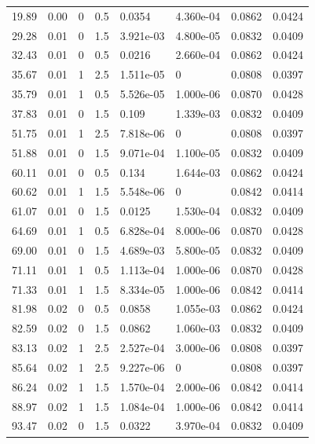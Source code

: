\documentclass[preview]{standalone}
\begin{document}
{{\begin{tabular}{L{1.2cm}C{1.2cm} C{0.3cm}C{0.5cm} C{1.4cm}C{1.4cm} C{1.4cm}C{1.4cm}}
  19.89  &  0.00  & 0     & 0.5 &  0.0354  & 4.360e-04  & 0.0862 &  0.0424   \\ 
  29.28  &  0.01  & 0     & 1.5 &  3.921e-03  & 4.800e-05  & 0.0832 &  0.0409   \\ 
  32.43  &  0.01  & 0     & 0.5 &  0.0216  & 2.660e-04  & 0.0862 &  0.0424   \\ 
  35.67  &  0.01  & 1     & 2.5 &  1.511e-05  & 0  & 0.0808 &  0.0397   \\ 
  35.79  &  0.01  & 1     & 0.5 &  5.526e-05  & 1.000e-06  & 0.0870 &  0.0428   \\ 
  37.83  &  0.01  & 0     & 1.5 &  0.109  & 1.339e-03  & 0.0832 &  0.0409   \\ 
  51.75  &  0.01  & 1     & 2.5 &  7.818e-06  & 0  & 0.0808 &  0.0397   \\ 
  51.88  &  0.01  & 0     & 1.5 &  9.071e-04  & 1.100e-05  & 0.0832 &  0.0409   \\ 
  60.11  &  0.01  & 0     & 0.5 &  0.134  & 1.644e-03  & 0.0862 &  0.0424   \\ 
  60.62  &  0.01  & 1     & 1.5 &  5.548e-06  & 0  & 0.0842 &  0.0414   \\ 
  61.07  &  0.01  & 0     & 1.5 &  0.0125  & 1.530e-04  & 0.0832 &  0.0409   \\ 
  64.69  &  0.01  & 1     & 0.5 &  6.828e-04  & 8.000e-06  & 0.0870 &  0.0428   \\ 
  69.00  &  0.01  & 0     & 1.5 &  4.689e-03  & 5.800e-05  & 0.0832 &  0.0409   \\ 
  71.11  &  0.01  & 1     & 0.5 &  1.113e-04  & 1.000e-06  & 0.0870 &  0.0428   \\ 
  71.33  &  0.01  & 1     & 1.5 &  8.334e-05  & 1.000e-06  & 0.0842 &  0.0414   \\ 
  81.98  &  0.02  & 0     & 0.5 &  0.0858  & 1.055e-03  & 0.0862 &  0.0424   \\ 
  82.59  &  0.02  & 0     & 1.5 &  0.0862  & 1.060e-03  & 0.0832 &  0.0409   \\ 
  83.13  &  0.02  & 1     & 2.5 &  2.527e-04  & 3.000e-06  & 0.0808 &  0.0397   \\ 
  85.64  &  0.02  & 1     & 2.5 &  9.227e-06  & 0  & 0.0808 &  0.0397   \\ 
  86.24  &  0.02  & 1     & 1.5 &  1.570e-04  & 2.000e-06  & 0.0842 &  0.0414   \\ 
  88.97  &  0.02  & 1     & 1.5 &  1.084e-04  & 1.000e-06  & 0.0842 &  0.0414   \\ 
  93.47  &  0.02  & 0     & 1.5 &  0.0322  & 3.970e-04  & 0.0832 &  0.0409   \\ 

\end{tabular}}}
\end{document}
